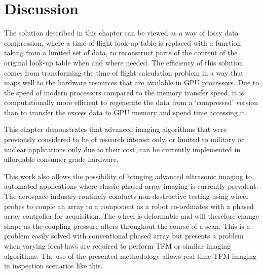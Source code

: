 \section{Discussion}

The solution described in this chapter can be viewed as a way of lossy data compression, where a time of flight look-up table is replaced with a function taking from a limited set of data, to reconstruct parts of the content of the original look-up table when and where needed. The efficiency of this solution comes from transforming the time of flight calculation problem in a way that maps well to the hardware resources that are available in GPU processors. Due to the speed of modern processors compared to the memory transfer speed, it is computationally more efficient to regenerate the data from a `compressed' version than to transfer the excess data to GPU memory and spend time accessing it.

This chapter demonstrates that advanced imaging algorithms that were previously considered to be of research interest only, or limited to military or nuclear applications only due to their cost, can be currently implemented in affordable consumer grade hardware.

This work also allows the possibility of bringing advanced ultrasonic imaging to automated applications where classic phased array imaging is currently prevalent. The aerospace industry routinely conducts non-destructive testing using wheel probes to couple an array to a component as a robot co-ordinates with a phased array controller for acquisition. The wheel is deformable and will therefore change shape as the coupling pressure alters throughout the course of a scan. This is a problem easily solved with conventional phased array but presents a problem when varying focal laws are required to perform TFM or similar imaging algorithms. The use of the presented methodology allows real time TFM imaging in inspection scenarios like this.




